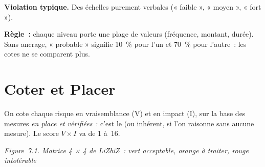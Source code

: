 \begin{boxalert}
\textbf{Violation typique.} Des échelles purement verbales (« faible »,
« moyen », « fort »).

\smallskip
\textbf{Règle~:} chaque niveau porte une plage de valeurs (fréquence,
montant, durée). Sans ancrage, « probable » signifie 10~\% pour l'un et
70~\% pour l'autre~: les cotes ne se comparent plus.
\end{boxalert}

\section{Coter et Placer}
\label{sec:c07-coter}

On cote chaque risque en vraisemblance (V) et en impact (I), sur la base
des mesures \emph{en place et vérifiées}~: c'est le  (ou inhérent, si l'on raisonne sans aucune mesure). Le score
$V \times I$ va de 1 à~16.

\begin{center}
\end{center}
\vspace{-0.4em}
\begin{center}{\small\itshape Figure~7.1. Matrice 4 × 4 de LiZbiZ~: vert acceptable, orange à traiter, rouge intolérable}\end{center}

